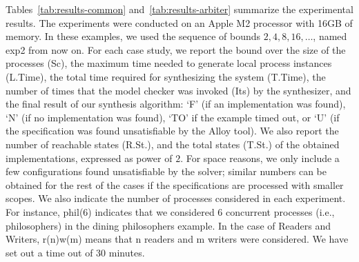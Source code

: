 Tables~\ref{tab:results-common} and~\ref{tab:results-arbiter}  summarize the experimental results. The experiments were conducted on an Apple M2 processor with 16GB of memory.   In these examples, we used the sequence of bounds $2,4,8,16,\dots$, named \textsf{exp2} from now on.
For each case study, we report the 
bound over the size of the processes (Sc), the maximum time needed to generate local process instances (L.Time), the total time required for synthesizing the system (T.Time), the number of times that the model checker was invoked (Its) by the synthesizer, and the final result of our synthesis algorithm:  `F' (if an implementation was found),  `N'  (if no implementation was found),  `TO'  if the example timed out, or `U'  (if the specification was found unsatisfiable by the Alloy tool).  We also report the number of reachable states (R.St.), and the total states (T.St.) of the obtained implementations, expressed as power of $2$.  For space reasons, we only include a few configurations found unsatisfiable by the solver; similar numbers can be obtained for the rest of the cases if the specifications are processed with smaller scopes. We also indicate the number of processes considered in each experiment.  For instance,  \textsf{phil(6)} indicates that we considered \textsf{6} concurrent processes (i.e., philosophers) in the dining philosophers example. In the case of Readers and Writers, 
\textsf{r(n)w(m)} means that \textsf{n} readers and \textsf{m} writers were considered.  We  have  set out a time out of 30 minutes.
